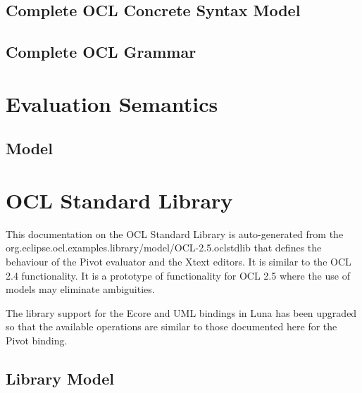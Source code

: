 \documentclass{scrreprt}   %
\begin{document}
\section{Complete OCL Concrete Syntax Model}

\section{Complete OCL Grammar}


\chapter{Evaluation Semantics}
\section{Model}


\chapter{OCL Standard Library}
This documentation on the OCL Standard Library is auto-generated from the
org.eclipse.ocl.examples.library/model/OCL-2.5.oclstdlib that defines
the behaviour of the Pivot evaluator and the Xtext editors. It is similar to the OCL 2.4 functionality.
It is a prototype of functionality for OCL 2.5 where the use of models may eliminate ambiguities.
		
The library support for the Ecore and UML bindings in Luna has been upgraded so that the available operations
are similar to those documented here for the Pivot binding.
\section{Library Model}

\end{document}

